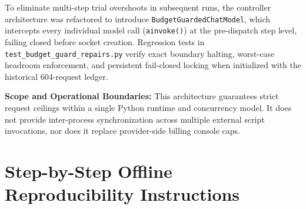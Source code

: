 \documentclass[11pt,a4paper]{article}
\begin{document}
To eliminate multi-step trial overshoots in subsequent runs, the controller architecture was refactored to introduce \texttt{BudgetGuardedChatModel}, which intercepts every individual model call (\texttt{ainvoke()}) at the pre-dispatch step level, failing closed before socket creation. Regression tests in \texttt{test\_budget\_guard\_repairs.py} verify exact boundary halting, worst-case headroom enforcement, and persistent fail-closed locking when initialized with the historical 604-request ledger.

\textbf{Scope and Operational Boundaries:} This architecture guarantees strict request ceilings within a single Python runtime and concurrency model. It does not provide inter-process synchronization across multiple external script invocations, nor does it replace provider-side billing console caps.

\clearpage
\section{Step-by-Step Offline Reproducibility Instructions}
\label{app:reproduce}
\end{document}
